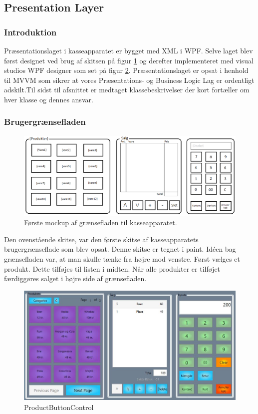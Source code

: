 
\subsection{Presentation Layer}

\subsubsection{Introduktion}
Præsentationslaget i kasseapparatet er bygget med XML i WPF. Selve laget blev først designet ved brug af skitsen på figur \ref{fig:KasseMockup} og derefter implementeret med visual studios WPF designer som set på figur \ref{fig:EndeligeGUI}. Præsentationslaget er opsat i henhold til MVVM som sikrer at vores Præsentations- og Business Logic Lag er ordentligt adskilt.Til sidst til afsnittet er medtaget klassebeskrivelser der kort fortæller om hver klasse og dennes ansvar. \\

\subsubsection{Brugergrænsefladen}

\begin{figure}[H]
	\centering
	\includegraphics[width=1\textwidth]{Systemdesign/Frontend/pics/KasseMockup}
	\caption{Første mockup af grænsefladen til kasseapparatet.}
	\label{fig:KasseMockup}
\end{figure}

Den ovenstående skitse, var den første skitse af kasseapparatets brugergrænseflade som blev opsat. Denne skitse er tegnet i paint. Idéen bag grænsefladen var, at man skulle tænke fra højre mod venstre. Først vælges et produkt. Dette tilføjes til listen i midten. Når alle produkter er tilføjet færdiggøres salget i højre side af grænsefladen.

\begin{figure}[H]
	\centering
	\includegraphics[width=1\textwidth]{Systemdesign/Frontend/pics/GUI}
	\caption{ProductButtonControl}
	\label{fig:EndeligeGUI}
\end{figure}

